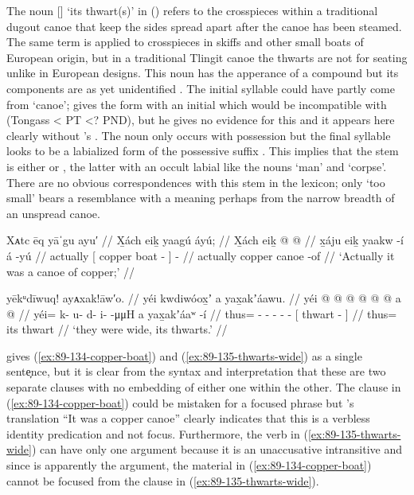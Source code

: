 The noun  [] ‘its thwart(s)’ in (\lastx) refers to the crosspieces within a traditional dugout canoe that keep the sides spread apart after the canoe has been steamed.
The same term is applied to crosspieces in skiffs and other small boats of European origin, but in a traditional Tlingit canoe the thwarts are not for seating unlike in European designs.
This noun has the apperance of a compound but its components are as yet unidentified \parencites[f04/84]{leer:1973}.
The initial syllable  could have partly come from  ‘canoe’; \textcite[66]{leer:1978b} gives the form  with an initial  which would be incompatible with  (Tongass  < PT  <?
PND), but he gives no evidence for this  and it appears here clearly without \citeauthor{swanton:1909}’s .
The noun  only occurs with possession but the final syllable looks to be a labialized form of the possessive suffix .
This implies that the stem is either  or , the latter with an occult labial like the nouns  ‘man’ and  ‘corpse’.
There are no obvious correspondences with this stem in the lexicon; only  ‘too small’ bears a resemblance with a meaning perhaps from the narrow breadth of an unspread canoe.

\ex\label{ex:89-134-copper-boat}%
%
\begingl
	\glpreamble	Xᴀtc ēq yāˈgu ayu′ //
	\glpreamble	X̱ách eiḵ yaagú áyú; //
	\gla	X̱ách {} eiḵ  @ {} {}  @ {} //
	\glb	x̱áju {} eiḵ yaakw -í {} á -yú //
	\glc	actually {}[ copper boat - {}]  - //
	\gld	actually {} copper canoe -of {}  {} //
	\glft	‘Actually it was a canoe of copper;’
		//
\endgl
\xe

\ex\label{ex:89-135-thwarts-wide}%
%
\begingl
	\glpreamble	yēkᵘdīwuq! ayᴀxak!āw′o. //
	\glpreamble	yéi kwdiwóox̱ʼ a yax̱akʼáawu. //
	\gla	yéi @  @ {} @ {} @ {} @ {} @ {}
		{} a  @ {} {} //
	\glb	yéi= k- u- d- i-  -μμH
		{} a yax̱akʼáaʷ -í {} //
	\glc	thus= - - - -  -
		{}[  thwart - {}] //
	\gld	thus=  {} {} {} {} {}
		{} its thwart {} {} //
	\glft	‘they were wide, its thwarts.’
		//
\endgl
\xe

\citeauthor{swanton:1909} gives (\ref{ex:89-134-copper-boat}) and (\ref{ex:89-135-thwarts-wide}) as a single sente̞nce, but it is clear from the syntax and interpretation that these are two separate clauses with no embedding of either one within the other.
The clause in (\ref{ex:89-134-copper-boat}) could be mistaken for a focused phrase but \citeauthor{swanton:1909}’s translation “It was a copper canoe” clearly indicates that this is a verbless identity predication and not focus.
Furthermore, the verb in (\ref{ex:89-135-thwarts-wide}) can have only one argument because it is an unaccusative intransitive and since  is apparently the argument, the material in (\ref{ex:89-134-copper-boat}) cannot be focused from the clause in (\ref{ex:89-135-thwarts-wide}).

